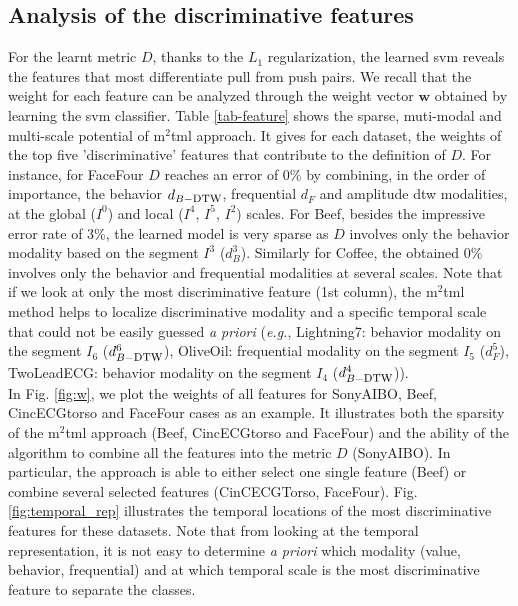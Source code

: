 \subsection{Analysis of the discriminative features}
For the learnt metric $D$, thanks to the $L_1$ regularization, the learned {\sc svm} reveals the features that most differentiate pull from push pairs. We recall that the weight for each feature can be analyzed through the weight vector $\textbf{w}$ obtained by learning the {\sc svm} classifier. Table \ref{tab-feature} shows the sparse, muti-modal and multi-scale potential of {\sc m}$^2${\sc tml} approach.  It gives for each dataset, the weights of the top five 'discriminative' features that contribute to the definition of $D$.  For instance,   for FaceFour $D$ reaches an error of 0\% by combining, in the order of importance, the behavior $d_{B-\mbox{\sc dtw}}$,  frequential $d_F$ and amplitude {\sc dtw} modalities, at the global ($I^0$) and  local ($I^4$, $I^5$, $I^2$) scales. For Beef, besides the impressive error rate of 3\%, the learned model is very sparse as $D$ involves only the behavior modality based on the segment $I^3$ ($d_B^3$). Similarly for Coffee, the obtained 0\% involves  only the behavior and frequential modalities at several scales. Note that if we look at only the most discriminative feature (1st column), the {\sc m}$^2${\sc tml} method helps to localize discriminative modality and a specific temporal scale that could not be easily guessed \textit{a priori} (\textit{e.g.}, Lightning7: behavior modality on the segment $I_6$ ($d_{B-\mbox{\sc dtw}}^6$), OliveOil: frequential modality on the segment $I_5$ ($d_F^5$), TwoLeadECG: behavior modality on the segment $I_4$ ($d_{B-\mbox{\sc dtw}}^4$)). \\ 

\noindent In Fig. \ref{fig:w}, we plot the weights of all features for SonyAIBO, Beef, CincECGtorso and FaceFour cases as an example. It illustrates both the sparsity of the {\sc m}$^2${\sc tml} approach (Beef, CincECGtorso and FaceFour) and the ability of the algorithm to combine all the features into the metric $D$ (SonyAIBO). In particular, the approach is able to either select one single feature (Beef) or combine several selected features (CinCECGTorso, FaceFour). Fig. \ref{fig:temporal_rep} illustrates the temporal locations of the most discriminative features for these datasets. Note that from looking at the temporal representation, it is not easy to determine \textit{a priori} which modality (value, behavior, frequential) and at which temporal scale is the most discriminative feature to separate the classes.

